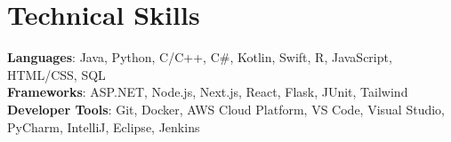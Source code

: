 \documentclass[letterpaper,11pt]{article}
\begin{document}
%
 \section{Technical Skills}
 \begin{itemize}[leftmargin=0.15in, label={}]
    \small{\item{
      \textbf{Languages}{: Java, Python, C/C++, C#, Kotlin, Swift, R, JavaScript, HTML/CSS, SQL } \\
      \textbf{Frameworks}{: ASP.NET, Node.js, Next.js, React, Flask, JUnit, Tailwind } \\
      \textbf{Developer Tools}{: Git, Docker, AWS Cloud Platform, VS Code, Visual Studio, PyCharm, IntelliJ, Eclipse, Jenkins } 
    }}
 \end{itemize}

\end{document}
